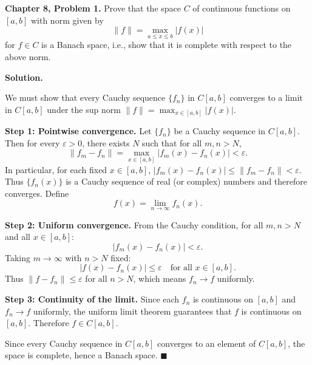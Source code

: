 \documentclass[12pt]{article}
\begin{document}
\textbf{Chapter 8, Problem 1.} Prove that the space $C$ of continuous functions on $[a,b]$ with norm given by
\[
\|f\| = \max_{a\le x\le b} |f(x)|
\]
for $f\in C$ is a Banach space, i.e., show that it is complete with respect to the above norm.

\bigskip
\textbf{Solution.}

We must show that every Cauchy sequence $\{f_n\}$ in $C[a,b]$ converges to a limit in $C[a,b]$ under the sup norm $\|f\|=\max_{x\in[a,b]}|f(x)|$.

\textbf{Step 1: Pointwise convergence.}
Let $\{f_n\}$ be a Cauchy sequence in $C[a,b]$. Then for every $\varepsilon>0$, there exists $N$ such that for all $m,n>N$,
\[
\|f_m - f_n\| = \max_{x\in[a,b]}|f_m(x)-f_n(x)| < \varepsilon.
\]
In particular, for each fixed $x\in[a,b]$, $|f_m(x)-f_n(x)|\le\|f_m-f_n\|<\varepsilon$. Thus $\{f_n(x)\}$ is a Cauchy sequence of real (or complex) numbers and therefore converges. Define
\[
f(x) = \lim_{n\to\infty} f_n(x).
\]

\textbf{Step 2: Uniform convergence.}
From the Cauchy condition, for all $m,n>N$ and all $x\in[a,b]$:
\[
|f_m(x)-f_n(x)|<\varepsilon.
\]
Taking $m\to\infty$ with $n>N$ fixed:
\[
|f(x)-f_n(x)|\le\varepsilon \quad \text{for all } x\in[a,b].
\]
Thus $\|f-f_n\|\le\varepsilon$ for all $n>N$, which means $f_n\to f$ uniformly.

\textbf{Step 3: Continuity of the limit.}
Since each $f_n$ is continuous on $[a,b]$ and $f_n\to f$ uniformly, the uniform limit theorem guarantees that $f$ is continuous on $[a,b]$. Therefore $f\in C[a,b]$.

Since every Cauchy sequence in $C[a,b]$ converges to an element of $C[a,b]$, the space is complete, hence a Banach space. $\blacksquare$
\end{document}
